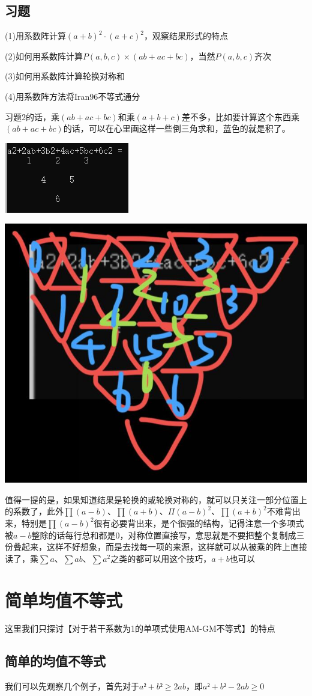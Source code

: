 \documentclass[UTF8]{ctexart}
\begin{document}
\subsection{习题}

(1)用系数阵计算$ (a+b)^{2}·(a+c)^{2} $，观察结果形式的特点

(2)如何用系数阵计算$ P(a,b,c)×(ab+ac+bc) $，当然$ P(a,b,c) $齐次

(3)如何用系数阵计算轮换对称和

(4)用系数阵方法将Iran96不等式通分

习题2的话，乘$ (ab+ac+bc) $和乘$ (a+b+c) $差不多，比如要计算这个东西乘$ (ab+ac+bc) $的话，可以在心里画这样一些倒三角求和，蓝色的就是积了。
\begin{center}
	\includegraphics[width=0.35\linewidth]{100}
\end{center}
\begin{center}
	\includegraphics[width=0.35\linewidth]{110}
\end{center}
值得一提的是，如果知道结果是轮换的或轮换对称的，就可以只关注一部分位置上的系数了，此外$ \prod (a-b) $、$ \prod (a+b) $、$ Π(a-b)^{2} $、$ \prod (a+b)^{2} $不难背出来，特别是$ \prod (a-b)^{2} $很有必要背出来，是个很强的结构，记得注意一个多项式被$ a-b $整除的话每行总和都是$ 0 $，对称位置直接写，意思就是不要把整个复制成三份叠起来，这样不好想象，而是去找每一项的来源，这样就可以从被乘的阵上直接读了，乘$ \displaystyle \sum a $、$ \displaystyle \sum ab $、$ \displaystyle \sum a^{2} $之类的都可以用这个技巧，$ a+b $也可以
\section{简单均值不等式}
这里我们只探讨【对于若干系数为1的单项式使用AM-GM不等式】的特点

\subsection{简单的均值不等式}
我们可以先观察几个例子，首先对于$ a²+b²\geq2ab $，即$ a²+b²-2ab\geq0 $
\end{document}
